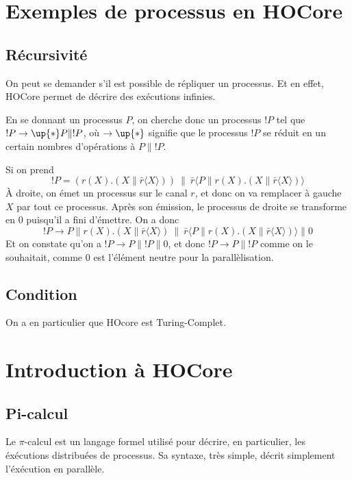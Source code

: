 \documentclass{article}
\def\pic{$\pi$-calcul }
\begin{document}
\section{Exemples de processus en HOCore}
\subsection{Récursivité}

On peut se demander s'il est possible de répliquer un processus. Et en effet, HOCore permet de décrire des exécutions infinies.

En se donnant un processus $P$, on cherche donc un processus $!P$ tel que $!P\rightarrow\up{*}P\|!P$, où $\rightarrow\up{*}$ signifie que le processus $!P$ se réduit en un certain nombres d'opérations à $P\|!P$.

Si on prend $$!P = (r(X).(X\|\bar{r}\langle X\rangle))\ \|\ \bar{r}\langle P\|r(X).(X\|\bar{r}\langle X\rangle)\rangle$$
À droite, on émet un processus sur le canal $r$, et donc on va remplacer à gauche $X$ par tout ce processus. Après son émission, le processus de droite se transforme en $0$ puisqu'il a fini d'émettre.
On a donc $$!P\rightarrow P\|r(X).(X\|\bar{r}\langle X\rangle)\ \|\ \bar{r}\langle P\|r(X).(X\|\bar{r}\langle X\rangle)\rangle\| 0$$
Et on constate qu'on a $!P\rightarrow P\|!P\|0$, et donc $!P\rightarrow P\|!P$ comme on le souhaitait, comme $0$ est l'élément neutre pour la parallèlisation.

\subsection{Condition}

On a en particulier que HOcore est Turing-Complet. %







\newpage
\section{Introduction à HOCore}
\subsection{Pi-calcul}
Le \pic est un langage formel utilisé pour décrire, en particulier, les éxécutions distribuées de processus. Sa syntaxe, très simple, décrit simplement l'éxécution en parallèle.
\end{document}
